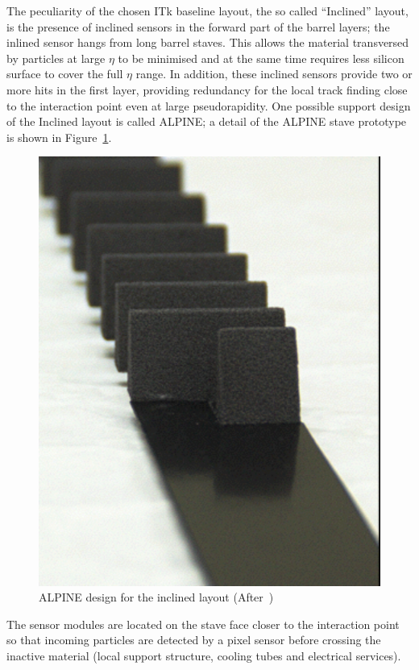The peculiarity of the chosen ITk baseline layout, the so called ``Inclined'' layout, is the presence of 
inclined sensors in the forward part of the barrel layers; the inlined sensor hangs from  long 
barrel staves.
   This allows the material transversed by particles at 
large  $\eta$ to be minimised and at the same time requires less silicon surface to cover the full  $\eta$  
range. In addition, these inclined sensors provide two or more hits in the first layer, providing redundancy for the local track finding close to the interaction point even at large pseudorapidity.
One possible  support design of the Inclined layout is called ALPINE; a detail of the ALPINE stave 
prototype is shown in Figure~\ref{fig:ALPINE}.
\begin{figure}[!htpb]
\centering
\includegraphics[height=0.25\textheight]{ALPINE.pdf}
\caption{\label{fig:ALPINE}ALPINE design for the inclined layout (After~\cite{ITkStripsTDR})}
\end{figure}
The sensor modules are located on the stave face closer to the interaction point so that incoming particles 
are detected by a pixel sensor before crossing the inactive material (local support structure, cooling tubes 
and electrical services).

